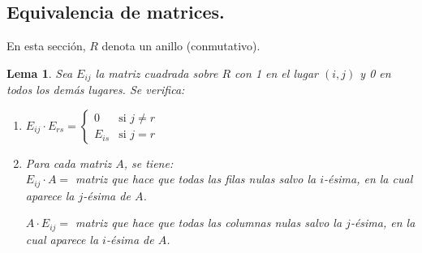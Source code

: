 \documentclass{article}
\theoremstyle{theorem-style}  %
\newtheorem{lemma}[theorem]{Lema}
\theoremstyle{definition}
\theoremstyle{example-style}
\begin{document}
	\subsection{Equivalencia de matrices.}
	En esta sección, $ R $ denota un anillo (conmutativo).
	\begin{lemma}
		Sea $ E_{ij} $ la matriz cuadrada sobre $ R $ con 1 en el lugar $ (i,j) $ y 0 en todos los demás lugares. Se verifica:
		\begin{enumerate}[\hspace{1cm}i)]
			\item $E_{ij} \cdot E_{rs}= \begin{cases}
			0 &\text{si } j\neq r\\
			E_{is} &\text{si } j=r
			\end{cases}$
			\item Para cada matriz $A$, se tiene:\\
				$ E_{ij} \cdot A= $ matriz que hace que todas las filas nulas salvo la $ i $-ésima, en la cual aparece la $ j $-ésima de $ A $.

				$A \cdot E_{ij} = $ matriz que hace que todas las columnas nulas salvo la $ j $-ésima, en la cual aparece la $ i $-ésima de $ A $.
		\end{enumerate}
	\end{lemma}
\end{document}
